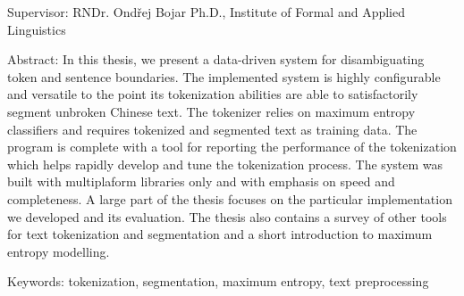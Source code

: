 {\begin{singlespace}
Supervisor:
RNDr. Ondřej Bojar Ph.D., Institute of Formal and Applied Linguistics

Abstract:
In this thesis, we present a data-driven system for disambiguating token and
sentence boundaries. The implemented system is highly configurable and
versatile to the point its tokenization abilities are able to satisfactorily
segment unbroken Chinese text. The tokenizer relies on maximum entropy
classifiers and requires tokenized and segmented text as training data. The
program is complete with a tool for reporting the performance of the
tokenization which helps rapidly develop and tune the tokenization process. The
system was built with multiplaform libraries only and with emphasis on speed
and completeness. A large part of the thesis focuses on the particular
implementation we developed and its evaluation. The thesis also contains a
survey of other tools for text tokenization and segmentation and a short
introduction to maximum entropy modelling.

Keywords:
tokenization, segmentation, maximum entropy, text preprocessing

\end{singlespace}

\vss}

\newpage
